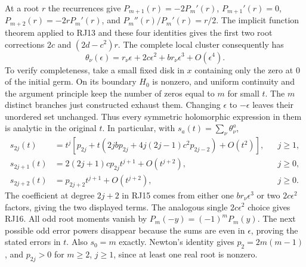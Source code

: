 At a root $r$ the recurrences give
$P_{m+1}(r)=-2P_m'(r)$,
$P_{m+1}'(r)=0$,
$P_{m+2}(r)=-2rP_m'(r)$, and
$P_m''(r)/P_m'(r)=r/2$.
The implicit function theorem applied to RJ13 and these four
identities gives the first two root corrections $2c$ and
$(2d-c^2)r$. The complete local cluster consequently has
\[
 \theta_\nu(\epsilon)=r_\nu\epsilon+2c\epsilon^2
                   +b r_\nu\epsilon^3+O(\epsilon^4).
 \tag{RJ14}
\]
To verify completeness, take a small fixed disk in $x$ containing
only the zero at $0$ of the initial germ. On its boundary $H_0$
is nonzero, and uniform continuity and the argument principle keep
the number of zeros equal to $m$ for small $t$. The $m$ distinct
branches just constructed exhaust them. Changing $\epsilon$ to
$-\epsilon$ leaves their unordered set unchanged. Thus every
symmetric holomorphic expression in them is analytic in the original
$t$. In particular, with $s_a(t)=\sum_\nu\theta_\nu^a$,
\begin{align}
 s_{2j}(t)&=t^j\left[p_{2j}+t\left(2jb p_{2j}
                 +4j(2j-1)c^2p_{2j-2}\right)+O(t^2)\right],
                       &&j\ge1,\tag{RJ15}\\
 s_{2j+1}(t)&=2(2j+1)c p_{2j}t^{j+1}+O(t^{j+2}),
                       &&j\ge0,\tag{RJ16}\\
 s_{2j+2}(t)&=p_{2j+2}t^{j+1}+O(t^{j+2}),
                       &&j\ge0.\tag{RJ17}
\end{align}
The coefficient at degree $2j+2$ in RJ15 comes from either one
$br_\nu\epsilon^3$ or two $2c\epsilon^2$ factors, giving the
two displayed terms. The analogous single $2c\epsilon^2$ choice
gives RJ16. All odd root moments vanish by $P_m(-y)=(-1)^mP_m(y)$.
The next possible odd error powers disappear because the sums are
even in $\epsilon$, proving the stated errors in $t$. Also $s_0=m$
exactly. Newton's identity gives $p_2=2m(m-1)$, and $p_{2j}>0$
for $m\ge2$, $j\ge1$, since at least one real root is nonzero.

